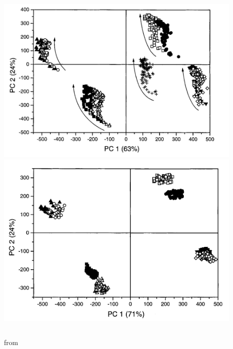 \documentclass{beamer}
\newcommand{\mancite}[1]{{\scriptsize{\textbf{\color{MainGreen}{[#1] }}}}}
\begin{document}
\begin{frame}
\begin{center}
\begin{columns}
  \includegraphics[width=0.9\textwidth]{images/mvar-drift-1.png}
  \includegraphics[width=0.9\textwidth]{images/mvar-drift-2.png}
\end{columns}
{\tiny from \mancite{Artursson, 2002}}
\end{center}
\end{frame}
\end{document}
